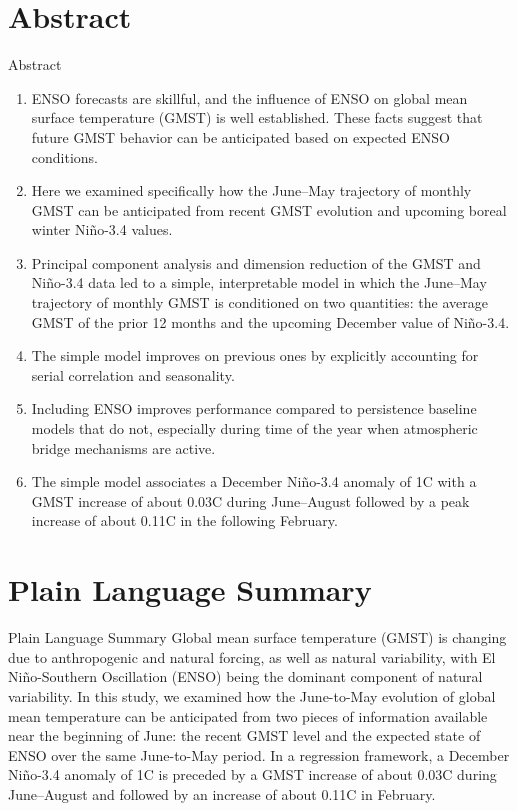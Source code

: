 \documentclass[aspectratio=169,xcolor=dvipsnames]{beamer}
\begin{document}
\section*{Abstract}
\begin{frame}{Abstract}
\begin{enumerate}\scriptsize
\item ENSO forecasts are skillful, and the influence of ENSO on global
  mean surface temperature (GMST) is well established. These facts
  suggest that future GMST behavior can be anticipated based on
  expected ENSO conditions.

\item Here we examined specifically how the June--May trajectory of
  monthly GMST can be anticipated from recent GMST evolution and
  upcoming boreal winter Ni\~no-3.4 values.

\item Principal component analysis and dimension reduction of the GMST
  and Ni\~no-3.4 data led to a simple, interpretable model in which
  the June--May trajectory of monthly GMST is conditioned on two
  quantities: the average GMST of the prior 12 months and the upcoming
  December value of Ni\~no-3.4.

\item The simple model improves on previous ones by explicitly
  accounting for serial correlation and seasonality.
  
\item Including ENSO improves performance compared to persistence
  baseline models that do not, especially during time of the year when
  atmospheric bridge mechanisms are active.

\item The simple model associates a December Ni\~no-3.4 anomaly of
  1\textdegree C with a GMST increase of about 0.03\textdegree C
  during June--August followed by a peak increase of about
  0.11\textdegree C in the following February.
  
\end{enumerate}
\end{frame}

\section*{Plain Language Summary}
\begin{frame}{Plain Language Summary}
  Global mean surface temperature (GMST) is changing due to
  anthropogenic and natural forcing, as well as natural variability,
  with El Ni\~no-Southern Oscillation (ENSO) being the dominant
  component of natural variability. In this study, we examined how the
  June-to-May evolution of global mean temperature can be anticipated
  from two pieces of information available near the beginning of June:
  the recent GMST level and the expected state of ENSO over the same
  June-to-May period. In a regression framework, a December Ni\~no-3.4
  anomaly of 1\textdegree C is preceded by a GMST increase of about
  0.03\textdegree C during June--August and followed by an increase of
  about 0.11\textdegree C in February.
\end{frame}
\end{document}
